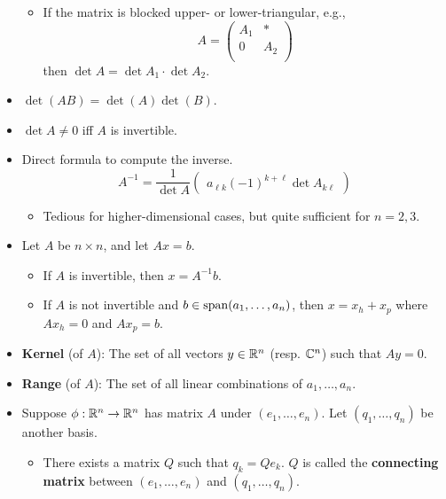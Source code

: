 \documentclass[../notes.tex]{subfiles}
\begin{document}
\begin{itemize}
\begin{itemize}
        \item If the matrix is blocked upper- or lower-triangular, e.g.,
        \begin{equation*}
            A =
            \begin{pmatrix}
                A_1 & *\\
                0 & A_2\\
            \end{pmatrix}
        \end{equation*}
        then $\det A=\det A_1\cdot\det A_2$.
    \end{itemize}
    \item $\det(AB)=\det(A)\det(B)$.
    \item $\det A\neq 0$ iff $A$ is invertible.
    \item Direct formula to compute the inverse.
    \begin{equation*}
        A^{-1} = \frac{1}{\det A}
        \begin{pmatrix}
            a_{\ell k}(-1)^{k+\ell}\det A_{k\ell}
        \end{pmatrix}
    \end{equation*}
    \begin{itemize}
        \item Tedious for higher-dimensional cases, but quite sufficient for $n=2,3$.
    \end{itemize}
    \item Let $A$ be $n\times n$, and let $Ax=b$.
    \begin{itemize}
        \item If $A$ is invertible, then $x=A^{-1}b$.
        \item If $A$ is not invertible and $b\in\operatorname{span}(a_1,\dots,a_n)$, then $x=x_h+x_p$ where $Ax_h=0$ and $Ax_p=b$.
    \end{itemize}
    \item \textbf{Kernel} (of $A$): The set of all vectors $y\in\mathbb{R}^n$ (resp. $\mathbb{C}^n$) such that $Ay=0$.
    \item \textbf{Range} (of $A$): The set of all linear combinations of $a_1,\dots,a_n$.
    \item Suppose $\phi:\mathbb{R}^n\to\mathbb{R}^n$ has matrix $A$ under $(e_1,\dots,e_n)$. Let $(q_1,\dots,q_n)$ be another basis.
    \begin{itemize}
        \item There exists a matrix $Q$ such that $q_k=Qe_k$. $Q$ is called the \textbf{connecting matrix} between $(e_1,\dots,e_n)$ and $(q_1,\dots,q_n)$.

\end{itemize}
\end{itemize}
\end{document}

